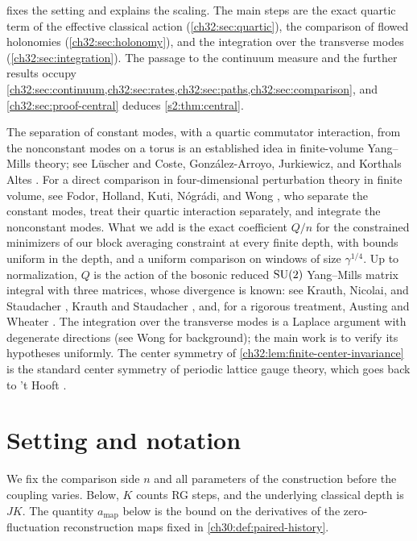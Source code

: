  fixes the setting and explains the scaling. The main steps are the exact quartic term of the effective classical action (\cref{ch32:sec:quartic}), the comparison of flowed holonomies (\cref{ch32:sec:holonomy}), and the integration over the transverse modes (\cref{ch32:sec:integration}). The passage to the continuum measure and the further results occupy \cref{ch32:sec:continuum,ch32:sec:rates,ch32:sec:paths,ch32:sec:comparison}, and \cref{ch32:sec:proof-central} deduces \cref{s2:thm:central}.

The separation of constant modes, with a quartic commutator interaction, from the nonconstant modes on a torus is an established idea in finite-volume Yang--Mills theory; see L\"uscher \cite{Luscher1983Torus} and Coste, Gonz\'alez-Arroyo, Jurkiewicz, and Korthals Altes \cite{CosteEtAl1985ZeroMomentum}. For a direct comparison in four-dimensional perturbation theory in finite volume, see Fodor, Holland, Kuti, N\'ogr\'adi, and Wong \cite[Section~2, (2.1)--(2.7)]{FodorEtAl2012FiniteVolumeFlow}, who separate the constant modes, treat their quartic interaction separately, and integrate the nonconstant modes. What we add is the exact coefficient $Q/n$ for the constrained minimizers of our block averaging constraint at every finite depth, with bounds uniform in the depth, and a uniform comparison on windows of size $\gamma^{1/4}$. Up to normalization, $Q$ is the action of the bosonic reduced $\mathrm{SU}(2)$ Yang--Mills matrix integral with three matrices, whose divergence is known: see Krauth, Nicolai, and Staudacher \cite[(24)]{KrauthNicolaiStaudacher1998}, Krauth and Staudacher \cite[(2)]{KrauthStaudacher1998FiniteIntegrals}, and, for a rigorous treatment, Austing and Wheater \cite[Section~3 and Appendix~A]{AustingWheater2001Convergence}. The integration over the transverse modes is a Laplace argument with degenerate directions (see Wong \cite{Wong2001AsymptoticIntegrals} for background); the main work is to verify its hypotheses uniformly. The center symmetry of \cref{ch32:lem:finite-center-invariance} is the standard center symmetry of periodic lattice gauge theory, which goes back to 't Hooft \cite{Hooft1979}.

\section{Setting and notation}\label{ch32:sec:setting}

We fix the comparison side $n$ and all parameters of the construction before the coupling varies. Below, $K$ counts RG steps, and the underlying classical depth is $JK$. The quantity $a_{\mathrm{map}}$ below is the bound on the derivatives of the zero-fluctuation reconstruction maps fixed in \cref{ch30:def:paired-history}.

